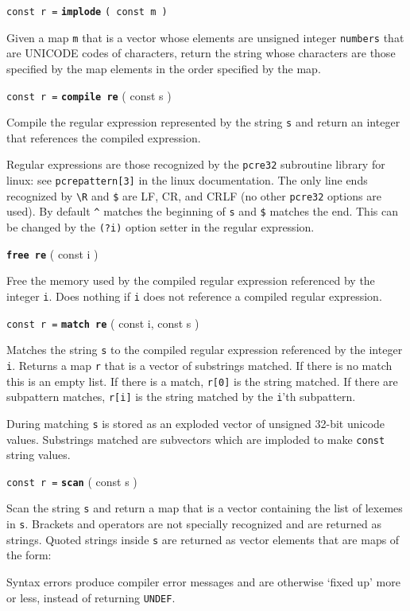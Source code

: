 \documentclass[12pt]{article}
\newcommand{\ttkey}[1]{{\tt \bfseries #1}}
\newenvironment{indpar}[1][0.3in]%
	{\begin{list}{}%
		     {\setlength{\itemsep}{0in}%
		      \setlength{\topsep}{0in}%
		      \setlength{\parsep}{1ex}%
		      \setlength{\labelwidth}{#1}%
		      \setlength{\leftmargin}{#1}%
		      \addtolength{\leftmargin}{\labelsep}}%
	 \item}%
	{\end{list}}
\begin{document}
{\tt const r =} \ttkey{implode} {\tt ( const m )}
\begin{indpar}
Given a map {\tt m} that is a vector whose elements are unsigned integer
{\tt numbers}
that are UNICODE codes of characters, return the string whose characters
are those specified by the map elements in the order specified by the map.
\end{indpar}

{\tt const r =} \ttkey{compile re} ( const s )
\begin{indpar}
Compile the regular expression represented by the string {\tt s}
and return an integer that references the compiled expression.

Regular expressions are those recognized by the {\tt pcre32}
subroutine library for linux: see {\tt pcrepattern[3]} in
the linux documentation.  The only line ends recognized
by {\tt \textbackslash R} and {\tt \$} are LF, CR, and CRLF (no other
{\tt pcre32} options are used).  By default {\tt \textasciicircum}
matches the beginning of {\tt s} and {\tt \$} matches the end.
This can be changed by the {\tt (?i)} option setter in the
regular expression.
\end{indpar}

\ttkey{free re} ( const i )
\begin{indpar}
Free the memory used by the compiled regular expression
referenced by the integer {\tt i}.  Does nothing if {\tt i}
does not reference a compiled regular expression.
\end{indpar}

{\tt const r =} \ttkey{match re} ( const i, const s  )
\begin{indpar}
Matches the string {\tt s} to the compiled regular expression
referenced by the integer {\tt i}.
Returns a map {\tt r} that is a vector of substrings matched.
If there is no match this is an empty list.  If there is
a match, {\tt r[0]} is the string matched.  If there are
subpattern matches, {\tt r[i]} is the string matched by the
{\tt i}'th subpattern.

During matching {\tt s} is stored as an exploded vector of
unsigned 32-bit unicode values.  Substrings matched are
subvectors which are imploded to make {\tt const} string values.
\end{indpar}

{\tt const r =} \ttkey{scan} ( const s  )
\begin{indpar}
Scan the string {\tt s} and return a map that is a vector
containing the list of lexemes in {\tt s}.  Brackets and
operators are not specially recognized and are returned
as strings.  Quoted strings inside {\tt s} are returned
as vector elements that are maps of the form: \\

Syntax errors produce compiler error messages and are
otherwise `fixed up' more or less, instead of returning {\tt UNDEF}.
\end{indpar}
\end{document}
